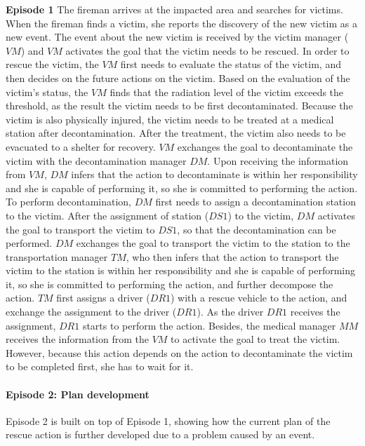 \begin{scenario}
\footnotesize
\textbf{Episode 1} The fireman arrives at the impacted area and searches for victims. When the fireman finds a victim, she reports the discovery of the new victim as a new event. The event about the new victim is received by the victim manager ($VM$) and $VM$ activates the goal that the victim needs to be rescued. In order to rescue the victim, the $VM$ first needs to evaluate the status of the victim, and then decides on the future actions on the victim. Based on the evaluation of the victim's status, the $VM$ finds that the radiation level of the victim exceeds the threshold, as the result the victim needs to be first decontaminated. Because the victim is also physically injured, the victim needs to be treated at a medical station after decontamination. After the treatment, the victim also needs to be evacuated to a shelter for recovery. $VM$ exchanges the goal to decontaminate the victim with the decontamination manager $DM$. Upon receiving the information from $VM$, $DM$ infers that the action to decontaminate is within her responsibility and she is capable of performing it, so she is committed to performing the action. To perform decontamination, $DM$ first needs to assign a decontamination station to the victim. After the assignment of station ($DS1$) to the victim, $DM$ activates the goal to transport the victim to $DS1$, so that the decontamination can be performed. $DM$ exchanges the goal to transport the victim to the station to the transportation manager $TM$, who then infers that the action to transport the victim to the station is within her responsibility and she is capable of performing it, so she is committed to performing the action, and further decompose the action. $TM$ first assigns a driver ($DR1$) with a rescue vehicle to the action, and exchange the assignment to the driver ($DR1$). As the driver $DR1$ receives the assignment, $DR1$ starts to perform the action. Besides, the medical manager $MM$ receives the information from the $VM$ to activate the goal to treat the victim. However, because this action depends on the action to decontaminate the victim to be completed first, she has to wait for it.
\end{scenario}

\paragraph*{Episode 2: Plan development} %
\label{par:episode_2_plan_development}
Episode 2 is built on top of Episode 1, showing how the current plan of the rescue action is further developed due to a problem caused by an event.

